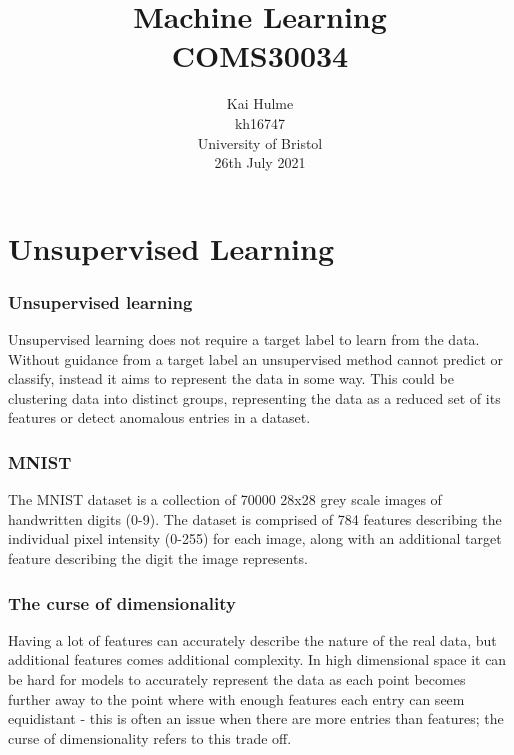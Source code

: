 \documentclass[11pt]{article}
\title{Machine Learning \\[1ex] COMS30034}
\author{
    Kai Hulme \\
    kh16747 \\
    University of Bristol \\
    26th July 2021 \\
}
\begin{document}
\maketitle
\newpage


\section{Unsupervised Learning}
\label{analysing_mnist}

\subsubsection{Unsupervised learning}

Unsupervised learning does not require a target label to learn from the data. Without guidance from a target label an unsupervised method cannot predict or classify, instead it aims to represent the data in some way. This could be clustering data into distinct groups, representing the data as a reduced set of its features or detect anomalous entries in a dataset. 

\subsubsection{MNIST}

The MNIST dataset is a collection of 70000 28x28 grey scale images of handwritten digits (0-9). The dataset is comprised of 784 features describing the individual pixel intensity (0-255) for each image, along with an additional target feature describing the digit the image represents.

\subsubsection{The curse of dimensionality}

Having a lot of features can accurately describe the nature of the real data, but additional features comes additional complexity. In high dimensional space it can be hard for models to accurately represent the data as each point becomes further away to the point where with enough features each entry can seem equidistant - this is often an issue when there are more entries than features; the curse of dimensionality refers to this trade off.
\end{document}
